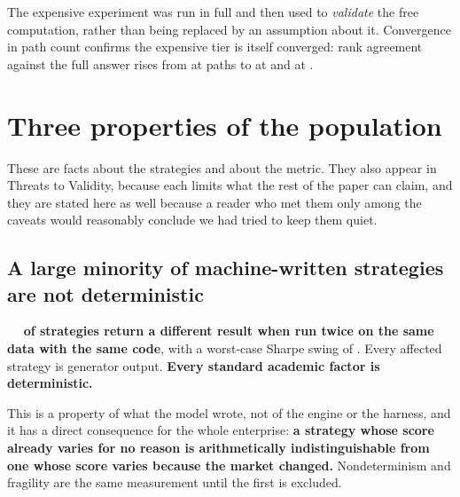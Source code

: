 \documentclass[11pt,a4paper]{article}
\begin{document}
The expensive experiment was run in full and then used to \emph{validate} the free computation,
rather than being replaced by an assumption about it. Convergence in path count confirms the
expensive tier is itself converged: rank agreement against the full answer rises from
\rsConvergenceLow{} at \rsConvergenceLowPaths{} paths to \rsConvergenceAtHundred{} at
\rsTierOnePaths{} and \rsConvergenceHigh{} at \rsConvergenceHighPaths{}.


\section{Three properties of the population}
\label{sec:properties}

These are facts about the strategies and about the metric. They also appear in Threats to Validity,
because each limits what the rest of the paper can claim, and they are stated here as well
because a reader who met them only among the caveats would reasonably conclude we had tried to keep
them quiet.

\subsection{A large minority of machine-written strategies are not deterministic}
\label{sec:nondeterminism}

\begin{finding}
\taglocal\ \ \textbf{\rsNNondeterministic{} of \rsNCalibrated{} strategies return a different result
when run twice on the same data with the same code}, with a worst-case Sharpe swing of
\rsWorstNondeterministicSwing{}. Every affected strategy is generator output. \textbf{Every
standard academic factor is deterministic.}
\end{finding}

This is a property of what the model wrote, not of the engine or the harness, and it has a direct
consequence for the whole enterprise: \textbf{a strategy whose score already varies for no reason
is arithmetically indistinguishable from one whose score varies because the market changed.}
Nondeterminism and fragility are the same measurement until the first is excluded.
\end{document}
